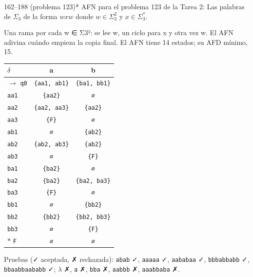 \documentclass[11pt]{article}
\begin{document}
\begin{ejercicio}{162--188 (problema 123)}{*}
AFN para el problema 123 de la Tarea 2: Las palabras de $\Sigma_3$ de la forma $wxw$ donde $w \in \Sigma_3^2$ y $x \in \Sigma_3^*$.
\end{ejercicio}
\proc Una rama por cada w ∈ Σ3²: se lee w, un ciclo para x y otra vez w. El AFN adivina cuándo empieza la copia final. El AFN tiene 14 estados; su AFD mínimo, 15.
\begin{center}\small\begin{tabular}{lcc}\toprule
$\delta$ & a & b \\\midrule
$\to$ \texttt{q0} & \texttt{\{aa1, ab1\}} & \texttt{\{ba1, bb1\}} \\
 \texttt{aa1} & \texttt{\{aa2\}} & \texttt{∅} \\
 \texttt{aa2} & \texttt{\{aa2, aa3\}} & \texttt{\{aa2\}} \\
 \texttt{aa3} & \texttt{\{F\}} & \texttt{∅} \\
 \texttt{ab1} & \texttt{∅} & \texttt{\{ab2\}} \\
 \texttt{ab2} & \texttt{\{ab2, ab3\}} & \texttt{\{ab2\}} \\
 \texttt{ab3} & \texttt{∅} & \texttt{\{F\}} \\
 \texttt{ba1} & \texttt{\{ba2\}} & \texttt{∅} \\
 \texttt{ba2} & \texttt{\{ba2\}} & \texttt{\{ba2, ba3\}} \\
 \texttt{ba3} & \texttt{\{F\}} & \texttt{∅} \\
 \texttt{bb1} & \texttt{∅} & \texttt{\{bb2\}} \\
 \texttt{bb2} & \texttt{\{bb2\}} & \texttt{\{bb2, bb3\}} \\
 \texttt{bb3} & \texttt{∅} & \texttt{\{F\}} \\
$*$ \texttt{F} & \texttt{∅} & \texttt{∅} \\
\bottomrule\end{tabular}\end{center}
Pruebas (✓ aceptada, ✗ rechazada): \texttt{abab} ✓, \texttt{aaaaa} ✓, \texttt{aababaa} ✓, \texttt{bbbabbabb} ✓, \texttt{bbaabbaababb} ✓; $\lambda$ ✗, \texttt{a} ✗, \texttt{bba} ✗, \texttt{aabbb} ✗, \texttt{aaabbaba} ✗.
\end{document}
